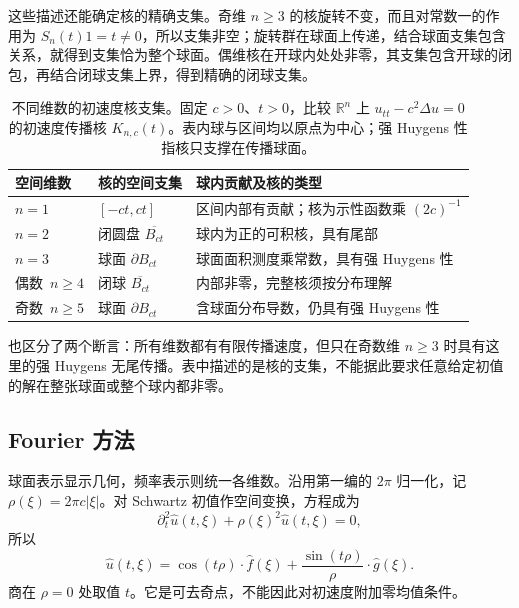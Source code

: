 这些描述还能确定核的精确支集。奇维 \(n\geq3\) 的核旋转不变，而且对常数一的作用为 \(S_n(t)1=t\ne0\)，所以支集非空；旋转群在球面上传递，结合球面支集包含关系，就得到支集恰为整个球面。偶维核在开球内处处非零，其支集包含开球的闭包，再结合闭球支集上界，得到精确的闭球支集。

\begin{table}[htbp]
\centering
\small
\setlength{\tabcolsep}{5pt}
\caption[不同维数的初速度核支集]{不同维数的初速度核支集。固定 \(c>0\)、\(t>0\)，比较 \(\mathbb R^n\) 上 \(u_{tt}-c^2\Delta u=0\) 的初速度传播核 \(K_{n,c}(t)\)。表内球与区间均以原点为中心；强 Huygens 性指核只支撑在传播球面。}
\label{b2:tab:11-dimension-kernel-support}
\begin{tabularx}{\linewidth}{@{}>{\raggedright\arraybackslash}p{2.6cm}>{\raggedright\arraybackslash}p{2.5cm}>{\raggedright\arraybackslash}X@{}}
\toprule
空间维数 & 核的空间支集 & 球内贡献及核的类型 \\
\midrule
\mbox{\(n=1\)} & \([-ct,ct]\) & 区间内部有贡献；核为示性函数乘 \((2c)^{-1}\) \\
\mbox{\(n=2\)} & 闭圆盘 \(\overline{B_{ct}}\) & 球内为正的可积核，具有尾部 \\
\mbox{\(n=3\)} & 球面 \(\partial B_{ct}\) & 球面面积测度乘常数，具有强 Huygens 性 \\
\mbox{偶数 \(n\geq4\)} & 闭球 \(\overline{B_{ct}}\) & 内部非零，完整核须按分布理解 \\
\mbox{奇数 \(n\geq5\)} & 球面 \(\partial B_{ct}\) & 含球面分布导数，仍具有强 Huygens 性 \\
\bottomrule
\end{tabularx}
\end{table}

也区分了两个断言：所有维数都有有限传播速度，但只在奇数维 \(n\geq3\) 时具有这里的强 Huygens 无尾传播。表中描述的是核的支集，不能据此要求任意给定初值的解在整张球面或整个球内都非零。

\subsection{Fourier 方法}
\label{b2:subsec:110303}

球面表示显示几何，频率表示则统一各维数。沿用第一编的 \(2\pi\) 归一化，记 \(\rho(\xi)=2\pi c|\xi|\)。对 Schwartz 初值作空间变换，方程成为
\[
 \partial_t^2\widehat u(t,\xi)+\rho(\xi)^2\widehat u(t,\xi)=0,
\]
所以
\begin{equation}\label{b2:eq:11-fourier-wave}
 \widehat u(t,\xi)=\cos(t\rho)\cdot\widehat f(\xi)
             +\dfrac{\sin(t\rho)}{\rho}\cdot\widehat g(\xi).
\end{equation}
商在 \(\rho=0\) 处取值 \(t\)。它是可去奇点，不能因此对初速度附加零均值条件。

